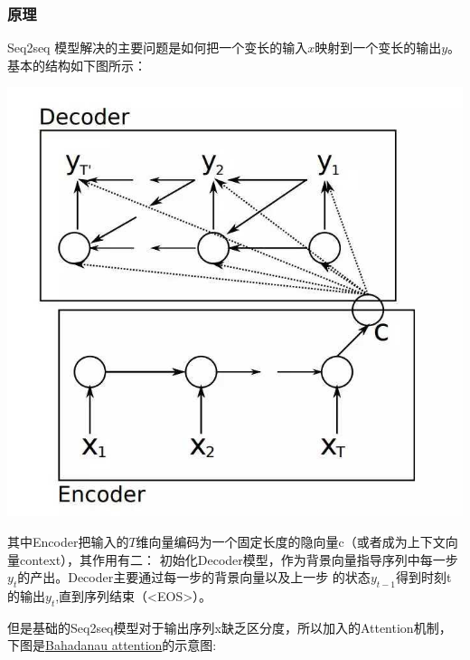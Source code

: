 \documentclass[UTF8,a4paper,10pt]{ctexart}
\begin{document}
   \subsubsection{原理}

    Seq2seq 模型解决的主要问题是如何把一个变长的输入$x$映射到一个变长的输出$y​$。基本的结构如下图所示：
    
    \centerline{\includegraphics[scale=0.3]{pics/190417-s1.jpg}}
    

    其中Encoder把输入的$T$维向量编码为一个固定长度的隐向量c（或者成为上下文向量context），其作用有二：
    初始化Decoder模型，作为背景向量指导序列中每一步$y_t$的产出。Decoder主要通过每一步的背景向量以及上一步
    的状态$y_{t-1}$得到时刻t的输出$y_t$,直到序列结束（<EOS>）。

    但是基础的Seq2seq模型对于输出序列x缺乏区分度，所以加入的Attention机制，下图是\href{https://arxiv.org/abs/1409.0473}{\color{blue}Bahadanau attention}的示意图:
    
\end{document}
